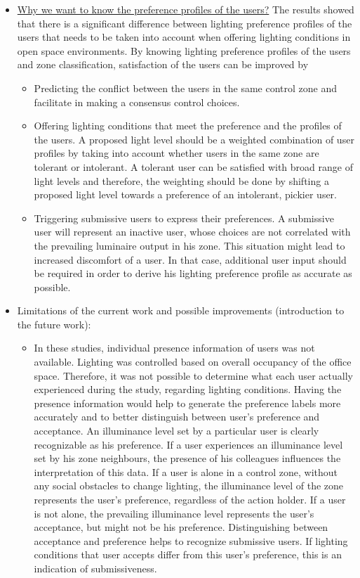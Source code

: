 \documentclass[a4paper]{article}
\begin{document}
\begin{itemize}
\item \underline{Why we want to know the preference profiles of the users?} The results showed that there is a significant difference between lighting preference profiles of the users that needs to be taken into account when offering lighting conditions in open space environments. By knowing lighting preference profiles of the users and zone classification, satisfaction of the users can be improved by 
	\begin{itemize}
		\item Predicting the conflict between the users in the same control zone and facilitate in making a consensus control choices.
		\item Offering lighting conditions that meet the preference and the profiles of the users. A proposed light level should be a weighted combination of user profiles by taking into account whether users in the same zone are tolerant or intolerant. A tolerant user can be satisfied with broad range of light levels and therefore, the weighting should be done by shifting a proposed light level towards a preference of an intolerant, pickier user.  
		\item Triggering submissive users to express their preferences. A submissive user will represent an inactive user, whose choices are not correlated with the prevailing luminaire output in his zone. This situation might lead to increased discomfort of a user. In that case, additional user input should be required in order to derive his lighting preference profile as accurate as possible.
	\end{itemize}
\item Limitations of the current work and possible improvements (introduction to the future work):
	\begin{itemize}
	\item In these studies, individual presence information of users was not available. Lighting was controlled based on overall occupancy of the office space. Therefore, it was not possible to determine what each user actually experienced during the study, regarding lighting conditions. Having the presence information would help to generate the preference labels more accurately and to better distinguish between user’s preference and acceptance. An illuminance level set by a particular user is clearly recognizable as his preference. If a user experiences an illuminance level set by his zone neighbours, the presence of his colleagues influences the interpretation of this data. If a user is alone in a control zone, without any social obstacles to change lighting, the illuminance level of the zone represents the user’s preference, regardless of the action holder. If a user is not alone, the prevailing illuminance level represents the user’s acceptance, but might not be his preference. Distinguishing between acceptance and preference helps to recognize submissive users. If lighting conditions that user accepts differ from this user’s preference, this is an indication of submissiveness.

\end{itemize}
\end{itemize}
\end{document}
